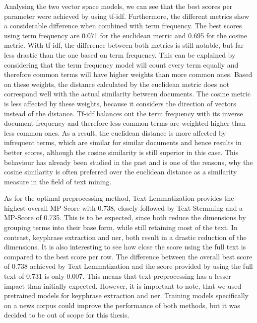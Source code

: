 Analysing the two vector space models, we can see that the best scores per parameter were achieved by using tf-idf.
Furthermore, the different metrics show a considerable difference when combined with term frequency.
The best scores using term frequency are 0.071 for the euclidean metric and 0.695 for the cosine metric.
With tf-idf, the difference between both metrics is still notable, but far less drastic than the one based on term frequency.
This can be explained by considering that the term frequency model will count every term equally
and therefore common terms will have higher weights than more common ones.
Based on these weights, the distance calculated by the euclidean metric does not correspond well
with the actual similarity between documents.
The cosine metric is less affected by these weights,
because it considers the direction of vectors instead of the distance.
Tf-idf balances out the term frequency with its inverse document frequency
and therefore less common terms are weighted higher than less common ones.
As a result, the euclidean distance is more affected by infrequent terms,
which are similar for similar documents and hence results in better scores,
although the cosine similarity is still superior in this case.
This behaviour has already been studied in the past\cite{Strehl00impactof, similarity_measures}
and is one of the reasons, why the cosine similarity is often preferred over the euclidean distance
as a similarity measure in the field of text mining.

As for the optimal preprocessing method, Text Lemmatization provides the highest overall MP-Score with 0.738,
closely followed by Text Stemming and a MP-Score of 0.735.
This is to be expected, since both reduce the dimensions
by grouping terms into their base form, while still retaining most of the text.
In contrast, keyphrase extraction and \Gls{ner}, both result in a drastic reduction of the dimensions.
It is also interesting to see how close the score using the full text is compared to the best score per row.
The difference between the overall best score of 0.738 achieved by Text Lemmatization
and the score provided by using the full text of 0.731 is only 0.007.
This means that text preprocessing has a lesser impact than initially expected.
However, it is important to note, that we used pretrained models for keyphrase extraction and \Gls{ner}.
Training models specifically on a news corpus could improve the performance of both methods,
but it was decided to be out of scope for this thesis.

